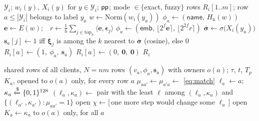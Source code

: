 \begin{algorithm}[t]
\caption{$\mathsf{LocalRows}$, run by $C_i$ (no communication)}
\label{alg:rows}
\begin{algorithmic}[1]
\Require $\mathcal{Y}_i$; $w_i(y)$, $X_i(y)$ for $y\in\mathcal{Y}_i$; $\mathsf{pp}$; mode $\in\{$exact, fuzzy$\}$
\Ensure rows $R_i[1..m]$; row $a\le|\mathcal{Y}_i|$ belongs to label $y_a$
  \State $w\gets\mathrm{Norm}(w_i(y_a))$ 
    \State $\phi_a\gets(\textsf{name},\,H_{\mathrm{n}}(w))$
  \Else
    \State $\mathbf{e}\gets E(w)$;\ \ $r\gets\frac1h\sum_{j\in\mathrm{top}_h}\langle\mathbf{e},\boldsymbol{\epsilon}_j\rangle$
    \State $\phi_a\gets(\textsf{emb},\,\lfloor2^{f}\mathbf{e}\rceil,\,\lfloor2^{2f}r\rceil)$ 
  \EndIf
  \State $\bar{\boldsymbol\sigma}\gets\sigma\big(X_i(y_a)\big)$ 
  \State $\mathbf{s}_a[j]\gets1$ iff $\boldsymbol{\xi}_j$ is among the $k$ nearest to $\bar{\boldsymbol\sigma}$ (cosine), else $0$
  \State $R_i[a]\gets(1,\ \phi_a,\ \mathbf{s}_a)$
\EndFor
{}
  \State $R_i[a]\gets(0,\ \mathbf{0},\ \mathbf{0})$ 
\EndFor
\State \Return $R_i$
\end{algorithmic}
\end{algorithm}

\begin{algorithm}[t]
\caption{$\Fgrp$: grouping, evaluated by the clients on Shamir shares}
\label{alg:group}
\begin{algorithmic}[1]
\Require shared rows of all clients, $N=nm$ rows $(v_a,\phi_a,\mathbf{s}_a)$ with owners $o(a)$; $\tau$, $t$, $T_p$
\Ensure $K_a$, opened to $o(a)$ only, for every row $a$
 
  \State $\mu_{aa'}\gets\mu_{a'a}\gets$ \eqref{eq:match} 
\EndFor
{}
  \State $\ell_a\gets a$;\quad $\kappa_a\xleftarrow{\$}\{0,1\}^{128}$ 
\EndFor
\Repeat
    \State $(\ell_a,\kappa_a)\gets$ pair with the least $\ell$ among $(\ell_a,\kappa_a)$ and $\{(\ell_{a'},\kappa_{a'}):\mu_{aa'}=1\}$
  \EndFor
  \State open $\chi\gets[\,$one more step would change some $\ell_a\,]$
\State open $K_a\gets\kappa_a$ to $o(a)$ only, for all $a$
\end{algorithmic}
\end{algorithm}

